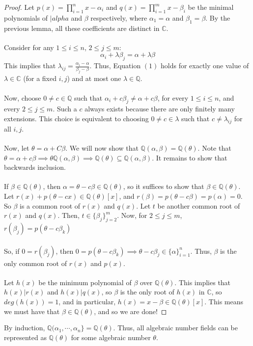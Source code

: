 \documentclass{article}
\newcommand{\C}{\mathbb{C}}
\newcommand{\Q}{\mathbb{Q}}
\begin{document}
\begin{proof}
Let $p(x)=\displaystyle\prod_{i=1}^n x-\alpha_i$ and $q(x)=\displaystyle\prod_{i=1}^m x-\beta_i$ be the minimal polynomials of $|alpha$ and $\beta$ respectively, where $\alpha_1=\alpha$ and $\beta_1=\beta$. By the previous lemma, all these coefficients are distinct in $\C$. \\
\\
\noindent Consider for any $1\leq i\leq n$, $2\leq j\leq m$:
\begin{equation}
\alpha_i+\lambda\beta_j = \alpha+\lambda \beta
\end{equation}
This implies that $\lambda_{ij} = \frac{\alpha_i-\alpha}{\beta_j-\beta}$. Thus, Equation $(1)$ holds for exactly one value of $\lambda\in\C$ (for a fixed $i,j$) and at most one $\lambda\in\Q$. \\
\\
Now, choose $0\neq c\in\Q$ such that $\alpha_i+c\beta_j\neq \alpha + c\beta$, for every $1\leq i\leq n $, and every $2\leq j \leq m$. Such a $c$ always exists because there are only finitely many extensions. This choice is equivalent to choosing $0\neq c\in\lambda$ such that $c\neq \lambda_{ij}$ for all $i,j$. \\
\\
Now, let $\theta=\alpha+C\beta$. We will now show that $\Q(\alpha,\beta)=\Q(\theta)$. Note that $\theta=\alpha+c\beta\implies \theta\Q(\alpha,\beta)\implies \Q(\theta)\subseteq \Q(\alpha,\beta)$. It remains to show that backwards inclusion. \\
\\
If $\beta\in \Q(\theta)$, then $\alpha=\theta-c\beta\in\Q(\theta)$, so it suffices to show that $\beta\in\Q(\theta)$. Let $r(x)+p(\theta-cx)\in \Q(\theta)[x]$, and $r(\beta)=p(\theta-c\beta)=p(\alpha)=0$. So $\beta$ is a common root of $r(x)$ and $q(x)$. Let $t$ be another common root of $r(x)$ and $q(x)$. Then, $t\in\{\beta_j\}_{j=2}^m$. Now, for $2\leq j\leq m$, $r(\beta_j)=p(\theta-c\beta_k)$\\ \\
\noindent So, if $0=r(\beta_j)$, then $0=p(\theta-c\beta_k)\implies \theta-c\beta_j\in\{\alpha\}_{i=1}^n$. Thus, $\beta$ is the only common root of $r(x)$ and $p(x)$. \\
\\
Let $h(x)$ be the minimum polynomial of $\beta$ over $\Q(\theta)$. This implies that $h(x)|r(x)$ and $h(x)|q(x)$, so $\beta$ is the only root of $h(x)$ in $\C$, so $deg(h(x))=1$, and in particular, $h(x)=x-\beta\in \Q(\theta)[x]$. This means we must have that $\beta\in\Q(\theta)$, and so we are done! 
\end{proof}
\noindent By induction, $\Q(\alpha_1,\cdots, \alpha_n\}=\Q(\theta)$. Thus, all algebraic number fields can be represented as $\Q(\theta)$ for some algebraic number $\theta$.
\end{document}
